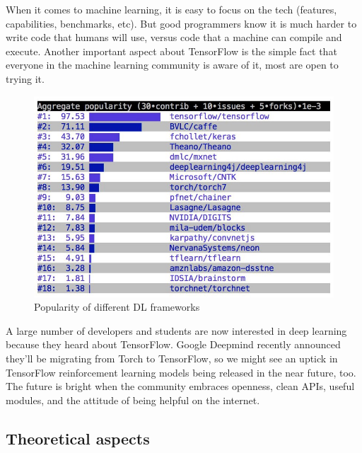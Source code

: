 \documentclass[a4paper,11pt]{article}
\begin{document}
 When it comes to machine learning, it is easy to focus on the tech (features, capabilities, benchmarks, etc). But good programmers know it is much harder to write code that humans will use, versus code that a machine can compile and execute. Another important aspect about TensorFlow is the simple fact that everyone in the machine learning community is aware of it, most are open to trying it.
 
 \begin{figure}[H]
 	\includegraphics[width=\textwidth]{tensorflowPopularity.jpeg}
 	\caption{Popularity of different DL frameworks}
 \end{figure}
 
 A large number of developers and students are now interested in deep learning because they heard about TensorFlow. Google Deepmind recently announced they’ll be migrating from Torch to TensorFlow, so we might see an uptick in TensorFlow reinforcement learning models being released in the near future, too. The future is bright when the community embraces openness, clean APIs, useful modules, and the attitude of being helpful on the internet.
 
 \subsection{Theoretical aspects}
\end{document}
